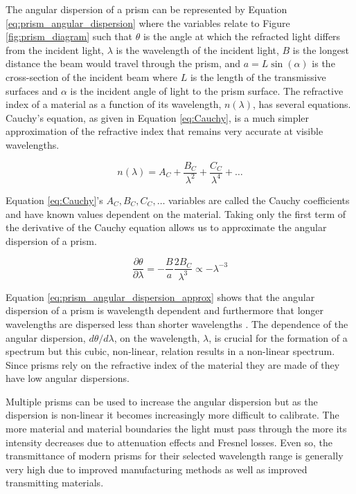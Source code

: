 The angular dispersion of a prism can be represented by Equation \ref{eq:prism_angular_dispersion} where the variables relate to Figure \ref{fig:prism_diagram} such that $\theta$ is the angle at which the refracted light differs from the incident light, $\lambda$ is the wavelength of the incident light, $B$ is the longest distance the beam would travel through the prism, and $a = L \sin(\alpha)$ is the cross-section of the incident beam where $L$ is the length of the transmissive surfaces and $\alpha$ is the incident angle of light to the prism surface. The refractive index of a material as a function of its wavelength, $n(\lambda)$, has several equations. Cauchy's equation, as given in Equation \ref{eq:Cauchy}, is a much simpler approximation of the refractive index that remains very accurate at visible wavelengths.

\begin{equation}
	n(\lambda) = A_{C} + \frac{B_{C}}{\lambda^{2}} + \frac{C_{C}}{\lambda^{4}} + \dots
    \label{eq:Cauchy}
\end{equation}

Equation \ref{eq:Cauchy}'s $A_{C}, B_{C}, C_{C}, \dots$ variables are called the Cauchy coefficients and have known values dependent on the material. Taking only the first term of the derivative of the Cauchy equation allows us to approximate the angular dispersion of a prism.

\begin{equation}
	\frac{\partial \theta}{\partial \lambda} = -\frac{B}{a}\frac{2B_{C}}{\lambda^{3}} \propto -\lambda^{-3}
    \label{eq:prism_angular_dispersion_approx}
\end{equation}

Equation \ref{eq:prism_angular_dispersion_approx} shows that the angular dispersion of a prism is wavelength dependent and furthermore that longer wavelengths are dispersed less than shorter wavelengths \citep{BirneyObsAstro, Hecht_optics}. The dependence of the angular dispersion, $d\theta/d\lambda$, on the wavelength, $\lambda$, is crucial for the formation of a spectrum but this cubic, non-linear, relation results in a non-linear spectrum. Since prisms rely on the refractive index of the material they are made of they have low angular dispersions.
\prgph

Multiple prisms can be used to increase the angular dispersion but as the dispersion is non-linear it becomes increasingly more difficult to calibrate. The more material and material boundaries the light must pass through the more its intensity decreases due to attenuation effects and Fresnel losses. Even so, the transmittance of modern prisms for their selected wavelength range is generally very high due to improved manufacturing methods as well as improved transmitting materials.
\prgph

